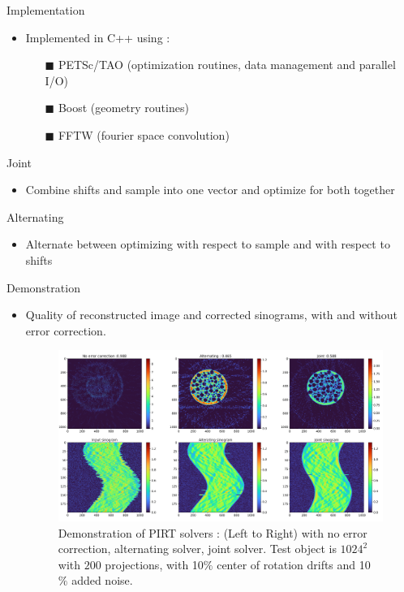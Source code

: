 \documentclass{beamer}
\begin{document}
\begin{frame}{Implementation}
	\begin{block}{}
		\begin{itemize}
			\item Implemented in C++ using :
			\begin{itemize}
				\item[$\blacksquare$] PETSc/TAO (optimization routines, data management and parallel I/O)
				\item[$\blacksquare$] Boost (geometry routines) 
				\item[$\blacksquare$] FFTW (fourier space convolution)
			\end{itemize}
		\end{itemize}
	\end{block}
	\begin{alertblock}{Joint}
		\begin{itemize}
			\item Combine shifts and sample into one vector and optimize for both together
		\end{itemize}
	\end{alertblock}
	\begin{exampleblock}{Alternating}
		\begin{itemize}
			\item Alternate between optimizing with respect to sample and with respect to shifts
		\end{itemize}
	\end{exampleblock}
\end{frame}

\begin{frame}{Demonstration}
	\begin{itemize}
		\item Quality of reconstructed image and corrected sinograms, with and without error correction.
		\begin{center}
			\begin{figure}
			    \includegraphics[scale=0.185]{figures/result_pirt_2d}
				\caption{Demonstration of PIRT solvers : (Left to Right) with no error correction, alternating solver, joint solver. Test object is $1024^2$ with $200$ projections, with 10$\%$ center of rotation drifts and 10 $\%$ added noise.}
			\end{figure}
		\end{center}
	\end{itemize}
\end{frame}
\end{document}
